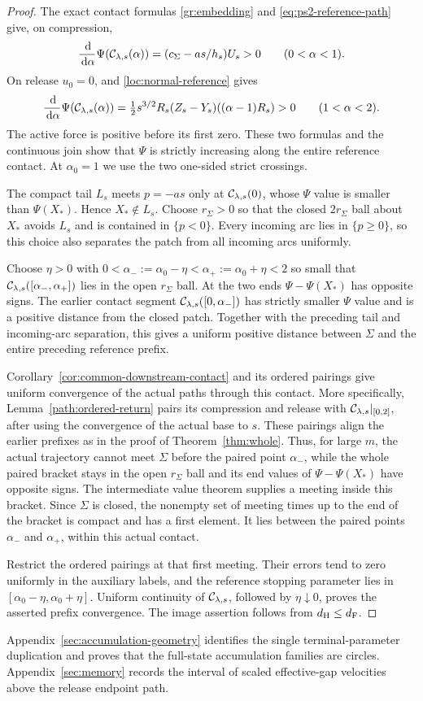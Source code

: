 \begin{proof}
The exact contact formulas \eqref{gr:embedding} and
\eqref{eq:ps2-reference-path} give, on compression,
\[
 \frac{\,\mathrm d}{\,\mathrm d\alpha}\Psi(\mathcal C_{\lambda,s}(\alpha))
       =(c_\Sigma-as/h_s)U_s>0\qquad(0<\alpha<1).
\]
On release $u_0=0$, and \eqref{loc:normal-reference} gives
\[
 \frac{\,\mathrm d}{\,\mathrm d\alpha}\Psi(\mathcal C_{\lambda,s}(\alpha))
   =\tfrac12s^{3/2}R_s
      (Z_s-Y_s)((\alpha-1)R_s)>0\qquad(1<\alpha<2).
\]
The active force is positive before its first zero. These two
formulas and the continuous join show that $\Psi$ is strictly
increasing along the entire reference contact. At $\alpha_0=1$
we use the two one-sided strict crossings.

The compact tail $L_s$ meets $p=-as$ only at
$\mathcal C_{\lambda,s}(0)$, whose $\Psi$ value is smaller than
$\Psi(X_*)$. Hence $X_*\notin L_s$. Choose $r_\Sigma>0$ so that the
closed $2r_\Sigma$ ball about $X_*$ avoids $L_s$ and is contained in
$\{p<0\}$. Every incoming arc lies in $\{p\ge0\}$, so this
choice also separates the patch from all incoming arcs uniformly.

Choose $\eta>0$ with
$0<\alpha_-:=\alpha_0-\eta<\alpha_+:=\alpha_0+\eta<2$
so small that $\mathcal C_{\lambda,s}([\alpha_-,\alpha_+])$
lies in the open $r_\Sigma$ ball. At the two ends $\Psi-\Psi(X_*)$
has opposite signs. The earlier contact segment
$\mathcal C_{\lambda,s}([0,\alpha_-])$ has strictly smaller
$\Psi$ value and is a positive distance from the closed patch.
Together with the preceding tail and incoming-arc separation,
this gives a uniform positive distance between $\Sigma$ and
the entire preceding reference prefix.

Corollary~\ref{cor:common-downstream-contact} and its ordered
pairings give uniform convergence of the actual paths through
this contact. More specifically,
Lemma~\ref{path:ordered-return} pairs its compression and release
with $\mathcal C_{\lambda,s}|_{[0,2]}$, after using the convergence of
the actual base to $s$. These pairings align the earlier prefixes
as in the proof of Theorem~\ref{thm:whole}. Thus, for large $m$,
the actual trajectory cannot meet $\Sigma$ before the paired
point $\alpha_-$, while the whole paired bracket stays in the
open $r_\Sigma$ ball and its end values of $\Psi-\Psi(X_*)$ have opposite
signs. The intermediate value theorem supplies a meeting inside
this bracket. Since $\Sigma$ is closed, the nonempty set of
meeting times up to the end of the bracket is compact and has a
first element. It lies between the paired points $\alpha_-$
and $\alpha_+$, within this actual contact.

Restrict the ordered pairings at that first meeting. Their
errors tend to zero uniformly in the auxiliary labels, and the
reference stopping parameter lies in
$[\alpha_0-\eta,\alpha_0+\eta]$. Uniform continuity of
$\mathcal C_{\lambda,s}$, followed by $\eta\downarrow0$, proves the
asserted prefix convergence. The image assertion follows from
$d_{\mathrm H}\le d_{\mathrm F}$.
\end{proof}

Appendix~\ref{sec:accumulation-geometry} identifies the single
terminal-parameter duplication and proves that the full-state accumulation
families are circles. Appendix~\ref{sec:memory} records the interval of
scaled effective-gap velocities above the release endpoint path.
